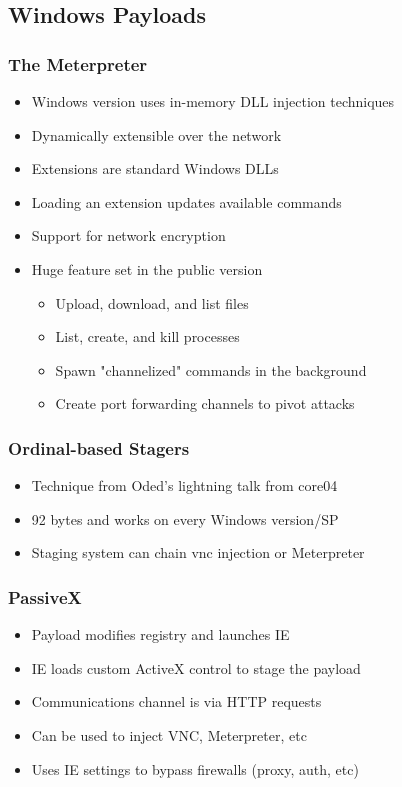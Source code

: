 \documentclass{beamer}
\begin{document}
\subsection{Windows Payloads}

\begin{frame}
	\frametitle{The Meterpreter}
	\begin{itemize}
		\item Windows version uses in-memory DLL injection techniques
		\item Dynamically extensible over the network
		\item Extensions are standard Windows DLLs
		\item Loading an extension updates available commands
		\item Support for network encryption
		\item Huge feature set in the public version
		\begin{itemize}
			\item Upload, download, and list files
			\item List, create, and kill processes
			\item Spawn "channelized" commands in the background
			\item Create port forwarding channels to pivot attacks
		\end{itemize}
	\end{itemize}	
\end{frame}

\begin{frame}
	\frametitle{Ordinal-based Stagers}
	\begin{itemize}
		\item Technique from Oded's lightning talk from core04
		\item 92 bytes and works on every Windows version/SP
		\item Staging system can chain vnc injection or Meterpreter
	\end{itemize}	
\end{frame}

\begin{frame}
	\frametitle{PassiveX}
	\begin{itemize}
		\item Payload modifies registry and launches IE
		\item IE loads custom ActiveX control to stage the payload
		\item Communications channel is via HTTP requests
		\item Can be used to inject VNC, Meterpreter, etc
		\item Uses IE settings to bypass firewalls (proxy, auth, etc)
	\end{itemize}	
\end{frame}
\end{document}
